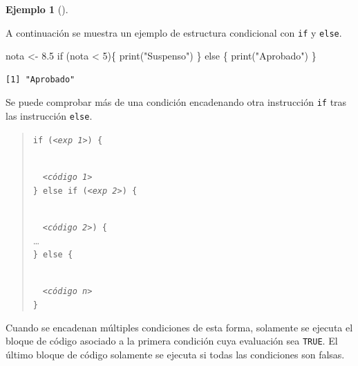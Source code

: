 \documentclass[
  a4paper,
]{scrreport}
\newenvironment{Shaded}{\begin{snugshade}}{\end{snugshade}}
\newcommand{\ControlFlowTok}[1]{\textcolor[rgb]{0.00,0.23,0.31}{#1}}
\newcommand{\DecValTok}[1]{\textcolor[rgb]{0.68,0.00,0.00}{#1}}
\newcommand{\FloatTok}[1]{\textcolor[rgb]{0.68,0.00,0.00}{#1}}
\newcommand{\FunctionTok}[1]{\textcolor[rgb]{0.28,0.35,0.67}{#1}}
\newcommand{\NormalTok}[1]{\textcolor[rgb]{0.00,0.23,0.31}{#1}}
\newcommand{\OtherTok}[1]{\textcolor[rgb]{0.00,0.23,0.31}{#1}}
\newcommand{\SpecialCharTok}[1]{\textcolor[rgb]{0.37,0.37,0.37}{#1}}
\newcommand{\StringTok}[1]{\textcolor[rgb]{0.13,0.47,0.30}{#1}}
\theoremstyle{definition}
\newtheorem{example}{Ejemplo}[chapter]
\theoremstyle{definition}
\theoremstyle{remark}
\begin{document}
\leavevmode{}%
\begin{example}[]\label{exm-condicional-doble}

A continuación se muestra un ejemplo de estructura condicional con
\texttt{if} y \texttt{else}.

\begin{Shaded}
\begin{Highlighting}[]
\NormalTok{nota }\OtherTok{\textless{}{-}} \FloatTok{8.5}
\ControlFlowTok{if}\NormalTok{ (nota }\SpecialCharTok{\textless{}} \DecValTok{5}\NormalTok{)\{}
  \FunctionTok{print}\NormalTok{(}\StringTok{"Suspenso"}\NormalTok{)}
\NormalTok{\} }\ControlFlowTok{else}\NormalTok{ \{}
  \FunctionTok{print}\NormalTok{(}\StringTok{"Aprobado"}\NormalTok{)}
\NormalTok{\}}
\end{Highlighting}
\end{Shaded}

\begin{verbatim}
[1] "Aprobado"
\end{verbatim}

\end{example}

Se puede comprobar más de una condición encadenando otra instrucción
\texttt{if} tras las instrucción \texttt{else}.

\begin{quote}
\texttt{if\ (}\emph{\texttt{\textless{}exp\ 1\textgreater{}}}\texttt{)\ \{}\strut \\
  \emph{\texttt{\textless{}código\ 1\textgreater{}}}\\
\texttt{\}\ else\ if\ (}\emph{\texttt{\textless{}exp\ 2\textgreater{}}}\texttt{)\ \{}\strut \\
  \emph{\texttt{\textless{}código\ 2\textgreater{}}}\texttt{)\ \{}\\
\ldots{}\\
\texttt{\}\ else\ \{}\strut \\
  \emph{\texttt{\textless{}código\ n\textgreater{}}}\\
\texttt{\}}
\end{quote}

Cuando se encadenan múltiples condiciones de esta forma, solamente se
ejecuta el bloque de código asociado a la primera condición cuya
evaluación sea \texttt{TRUE}. El último bloque de código solamente se
ejecuta si todas las condiciones son falsas.
\end{document}
